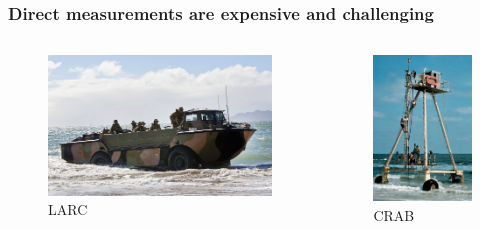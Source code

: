 \documentclass[7pt]{beamer}
\begin{document}
    \begin{frame}
      \frametitle{Direct measurements are expensive and challenging}
      \begin{columns}
        \centering
        \begin{figure}[h!]
          \includegraphics[width=1\linewidth]{img/LARC2.jpg}\hfill
          \centering
          \captionsetup{labelformat=empty}
          \caption{LARC}
        \end{figure}
        \begin{figure}[h]
          \includegraphics[width=0.8\linewidth]{img/CRAB3.jpg}
          \captionsetup{labelformat=empty}
          \caption{CRAB}
        \end{figure}
      \end{columns}
    \end{frame}
\end{document}
